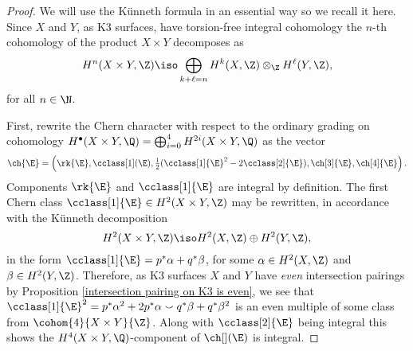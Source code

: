 \begin{proof}
    We will use the Künneth formula in an essential way so we recall it here. Since $X$ and $Y$, as K3 surfaces, have torsion-free integral cohomology the $n$-th cohomology of the product $X \times Y$ decomposes as
    \[
        H^n(X \times Y, \Z) \iso \bigoplus_{k+\ell = n} H^k(X, \Z) \otimes_\Z H^\ell(Y, \Z),
    \] 
    for all $n \in \N$.
    
    First, rewrite the Chern character with respect to the ordinary grading on cohomology $H^\bullet(X \times Y, \Q) = \bigoplus_{i=0}^4 H^{2i}(X \times Y, \Q)$ as the vector
    \[
        \ch{\E} = \left(\rk{\E}, \cclass[1](\E), \tfrac{1}{2}(\cclass[1]{\E}^2 - 2\cclass[2]{\E}), \ch[3]{\E}, \ch[4]{\E} \right).
    \]
    Components $\rk{\E}$ and $\cclass[1]{\E}$ are integral by definition. The first Chern class $\cclass[1]{\E} \in H^2(X\times Y, \Z)$ may be rewritten, in accordance with the Künneth decomposition
    \[
        H^2(X\times Y, \Z) \iso H^2(X, \Z) \oplus H^2(Y, \Z),
    \]
    in the form $\cclass[1]{\E} = p^*\alpha + q^*\beta$, for some $\alpha \in H^2(X, \Z)$ and $\beta \in H^2(Y, \Z)$. Therefore, as K3 surfaces $X$ and $Y$ have \emph{even} intersection pairings by Proposition \ref{intersection pairing on K3 is even}, we see that $\cclass[1]{\E}^2 = p^*\alpha^2 + 2 p^*\alpha \smallsmile q^*\beta + q^*\beta^2$ is an even multiple of some class from $\cohom{4}{X \times Y}{\Z}$. Along with $\cclass[2]{\E}$ being integral this shows the $H^4(X \times Y, \Q)$-component of $\ch[](\E)$ is integral.



\end{proof}

